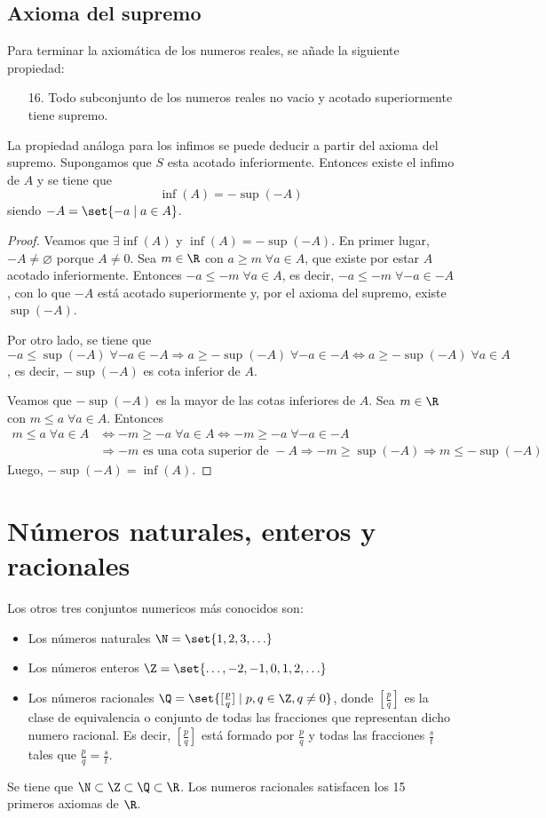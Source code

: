 \subsection{Axioma del supremo}
Para terminar la axiomática de los numeros reales, se añade la siguiente propiedad:
\begin{enumerate}
	\item[16.] Todo subconjunto de los numeros reales no vacio y acotado superiormente tiene supremo.
\end{enumerate}

La propiedad análoga para los infimos se puede deducir a partir del axioma del supremo. Supongamos que \(S \) esta acotado inferiormente. Entonces existe el infimo de \(A \) y se tiene que
\[
	\inf (A) = - \sup (-A )
\]
siendo \(-A = \set{-a \mid a \in A}\).
\begin{proof}
	Veamos que \(\exists \inf (A)\) y \(\inf (A) = - \sup (-A)\). En primer lugar, \(-A \neq \varnothing\) porque \(A \neq 0\). Sea \(m \in \R \) con \(a \geq m \; \forall a \in A\), que existe por estar \(A \) acotado inferiormente. Entonces \(-a \leq -m \; \forall a \in A\), es decir, \(-a \leq -m \; \forall -a \in -A \), con lo que \(-A \) está acotado superiormente y, por el axioma del supremo, existe \(\sup (-A)\). 
	
	Por otro lado, se tiene que \(-a \leq \sup (-A) \; \forall -a \in -A \Rightarrow a \geq -\sup (-A) \; \forall -a \in -A \iff  a \geq - \sup (-A) \; \forall a \in A\), es decir, \(-\sup (-A) \) es cota inferior de \(A \). 
	
	Veamos que \(-\sup (-A)\) es la mayor de las cotas inferiores de \(A \). Sea \(m \in \R\) con \(m \leq a \; \forall a \in A\). Entonces 
	\begin{align*}
		m \leq a \; \forall a \in A & \iff  -m \geq -a \; \forall a \in A \iff -m \geq -a \; \forall -a \in -A \\ & \Rightarrow -m \text{ es una cota superior de } -A \Rightarrow -m \geq \sup (-A) \Rightarrow m \leq -\sup (-A)
	\end{align*}
	Luego, \(-\sup (-A) = \inf (A)\).  
\end{proof}
\section{Números naturales, enteros y racionales}
Los otros tres conjuntos numericos más conocidos son:
\begin{itemize}
	\item Los números naturales \(\N = \set{1,2,3,\ldots }\)
	\item Los números enteros \(\Z = \set{\ldots,-2,-1,0,1,2,\ldots}\)
	\item Los números racionales \(\Q = \set{[\frac{p}{q}] \mid p,q \in \Z, q \neq 0 }\), donde \([\frac{p}{q }]\) es la clase de equivalencia o conjunto de todas las fracciones que representan dicho numero racional. Es decir, \([\frac{p}{q }]\) está formado por \(\frac{p}{q}\) y todas las fracciones \(\frac{s}{t }\) tales que \(\frac{p}{q } = \frac{s}{t }\).
\end{itemize}
Se tiene que \(\N \subset \Z \subset \Q \subset \R \). Los numeros racionales satisfacen los 15 primeros axiomas de \(\R \).

